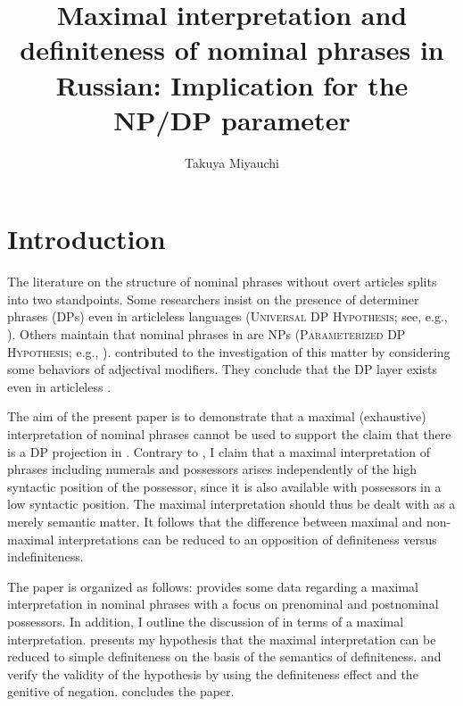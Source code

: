 \documentclass[output=paper,
colorlinks,
citecolor=brown,
newtxmath
]{langscibook}
\title{Maximal interpretation and definiteness of nominal phrases in Russian: Implication for the NP/DP parameter}
\author{%
Takuya Miyauchi\affiliation{The University of Tokyo}\orcid{0000-0003-4836-1617}}
\begin{document}
\maketitle

\section{Introduction}
The literature on the structure of  nominal phrases without overt articles splits into two standpoints. Some researchers insist on the presence of determiner phrases (DPs) even in articleless  languages (\textsc{Universal DP Hypothesis}; see, e.g., \citealt{Progovac1998,Rappaport2002,Rutkowski2002,Basic2004,Franks.Pereltsvaig2004, Pereltsvaig2007,Rutkowski.Maliszewska2007}). Others maintain that nominal phrases in  are NPs (\textsc{Parameterized DP Hypo\-thesis}; e.g., \citealt{Zlatic1998,Trenkic2004,Boskovic2005,Boskovic2007,Boskovic2009,Despic2013}). \citet{Kagan.Pereltsvaig2012} contributed to the investigation of this matter by considering some behaviors of adjectival modifiers. They conclude that the DP layer exists even in articleless .


The aim of the present paper is to demonstrate that a maximal (exhaustive) interpretation of nominal phrases cannot be used to support the claim that there is a DP projection in . Contrary to \citet{Kagan.Pereltsvaig2012}, I claim that a maximal interpretation of phrases including numerals and possessors arises independently of the high syntactic position of the possessor, since it is also available with possessors in a low syntactic position. The maximal interpretation should thus be dealt with as a merely semantic matter. It follows that the difference between maximal and non-maximal interpretations can be reduced to an opposition of definiteness versus indefiniteness.

The paper is organized as follows:  provides some data regarding a maximal interpretation in  nominal phrases with a focus on prenominal and postnominal possessors. In addition, I outline the discussion of \citet{Kagan.Pereltsvaig2012} in terms of a maximal interpretation.  presents my hypothesis that the maximal interpretation can be reduced to simple definiteness on the basis of the semantics of definiteness.  and  verify the validity of the hypothesis by using the definiteness effect and the genitive of negation.  concludes the paper.
\end{document}
